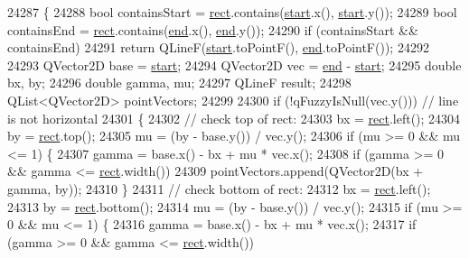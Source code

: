 \begin{DoxyCode}
24287                                                                 \{
24288   \textcolor{keywordtype}{bool} containsStart = \hyperlink{_gen_blob_8m_aea8f6815d9a63491fc422c5572c6b3c3}{rect}.contains(\hyperlink{class_q_c_p_item_line_a602da607a09498b0f152ada1d6851bc5}{start}.x(), \hyperlink{class_q_c_p_item_line_a602da607a09498b0f152ada1d6851bc5}{start}.y());
24289   \textcolor{keywordtype}{bool} containsEnd = \hyperlink{_gen_blob_8m_aea8f6815d9a63491fc422c5572c6b3c3}{rect}.contains(\hyperlink{class_q_c_p_item_line_a15598864c1c22a2497a1979c4980c4e1}{end}.x(), \hyperlink{class_q_c_p_item_line_a15598864c1c22a2497a1979c4980c4e1}{end}.y());
24290   \textcolor{keywordflow}{if} (containsStart && containsEnd)
24291     \textcolor{keywordflow}{return} QLineF(\hyperlink{class_q_c_p_item_line_a602da607a09498b0f152ada1d6851bc5}{start}.toPointF(), \hyperlink{class_q_c_p_item_line_a15598864c1c22a2497a1979c4980c4e1}{end}.toPointF());
24292 
24293   QVector2D base = \hyperlink{class_q_c_p_item_line_a602da607a09498b0f152ada1d6851bc5}{start};
24294   QVector2D vec = \hyperlink{class_q_c_p_item_line_a15598864c1c22a2497a1979c4980c4e1}{end} - \hyperlink{class_q_c_p_item_line_a602da607a09498b0f152ada1d6851bc5}{start};
24295   \textcolor{keywordtype}{double} bx, by;
24296   \textcolor{keywordtype}{double} gamma, mu;
24297   QLineF result;
24298   QList<QVector2D> pointVectors;
24299 
24300   \textcolor{keywordflow}{if} (!qFuzzyIsNull(vec.y())) \textcolor{comment}{// line is not horizontal}
24301   \{
24302     \textcolor{comment}{// check top of rect:}
24303     bx = \hyperlink{_gen_blob_8m_aea8f6815d9a63491fc422c5572c6b3c3}{rect}.left();
24304     by = \hyperlink{_gen_blob_8m_aea8f6815d9a63491fc422c5572c6b3c3}{rect}.top();
24305     mu = (by - base.y()) / vec.y();
24306     \textcolor{keywordflow}{if} (mu >= 0 && mu <= 1) \{
24307       gamma = base.x() - bx + mu * vec.x();
24308       \textcolor{keywordflow}{if} (gamma >= 0 && gamma <= \hyperlink{_gen_blob_8m_aea8f6815d9a63491fc422c5572c6b3c3}{rect}.width())
24309         pointVectors.append(QVector2D(bx + gamma, by));
24310     \}
24311     \textcolor{comment}{// check bottom of rect:}
24312     bx = \hyperlink{_gen_blob_8m_aea8f6815d9a63491fc422c5572c6b3c3}{rect}.left();
24313     by = \hyperlink{_gen_blob_8m_aea8f6815d9a63491fc422c5572c6b3c3}{rect}.bottom();
24314     mu = (by - base.y()) / vec.y();
24315     \textcolor{keywordflow}{if} (mu >= 0 && mu <= 1) \{
24316       gamma = base.x() - bx + mu * vec.x();
24317       \textcolor{keywordflow}{if} (gamma >= 0 && gamma <= \hyperlink{_gen_blob_8m_aea8f6815d9a63491fc422c5572c6b3c3}{rect}.width())

\end{DoxyCode}
